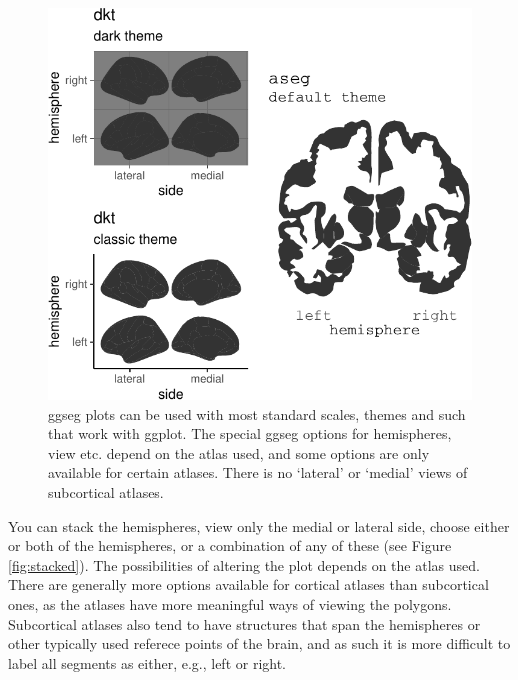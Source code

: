 \documentclass[fleqn,10pt]{wlpeerj} %
\begin{document}
\begin{figure}
\centering
\includegraphics{draft_1_files/figure-latex/void-1.pdf}
\caption{\label{fig:void}ggseg plots can be used with most standard scales, themes and such that work with ggplot. The special ggseg options for hemispheres, view etc. depend on the atlas used, and some options are only available for certain atlases. There is no `lateral' or `medial' views of subcortical atlases.}
\end{figure}

You can stack the hemispheres, view only the medial or lateral side, choose either or both of the hemispheres, or a combination of any of these (see Figure \ref{fig:stacked}).
The possibilities of altering the plot depends on the atlas used.
There are generally more options available for cortical atlases than subcortical ones, as the atlases have more meaningful ways of viewing the polygons.
Subcortical atlases also tend to have structures that span the hemispheres or other typically used referece points of the brain, and as such it is more difficult to label all segments as either, e.g., left or right.
\end{document}
